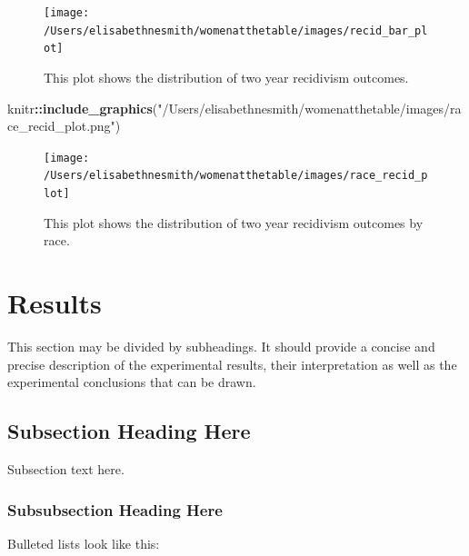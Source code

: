 \documentclass[water,article,submit,moreauthors,pdftex]{mdpi}
\newenvironment{Shaded}{\begin{snugshade}}{\end{snugshade}}
\newcommand{\KeywordTok}[1]{\textcolor[rgb]{0.13,0.29,0.53}{\textbf{#1}}}
\newcommand{\NormalTok}[1]{#1}
\newcommand{\OperatorTok}[1]{\textcolor[rgb]{0.81,0.36,0.00}{\textbf{#1}}}
\newcommand{\StringTok}[1]{\textcolor[rgb]{0.31,0.60,0.02}{#1}}
\begin{document}
\begin{figure}

{\centering \texttt{[image: /Users/elisabethnesmith/womenatthetable/images/recid\_bar\_plot]} 

}

\caption{This plot shows the distribution of two year recidivism outcomes.}\label{fig:recid plot}
\end{figure}

\begin{Shaded}
\begin{Highlighting}[]
\NormalTok{knitr}\OperatorTok{::}\KeywordTok{include_graphics}\NormalTok{(}\StringTok{"/Users/elisabethnesmith/womenatthetable/images/race_recid_plot.png"}\NormalTok{)}
\end{Highlighting}
\end{Shaded}

\begin{figure}

{\centering \texttt{[image: /Users/elisabethnesmith/womenatthetable/images/race\_recid\_plot]} 

}

\caption{This plot shows the distribution of two year recidivism outcomes by race.}\label{fig:recid race plot}
\end{figure}

\hypertarget{results}{%
\section{Results}\label{results}}

This section may be divided by subheadings. It should provide a concise
and precise description of the experimental results, their
interpretation as well as the experimental conclusions that can be
drawn.

\hypertarget{subsection-heading-here}{%
\subsection{Subsection Heading Here}\label{subsection-heading-here}}

Subsection text here.

\hypertarget{subsubsection-heading-here}{%
\subsubsection{Subsubsection Heading
Here}\label{subsubsection-heading-here}}

Bulleted lists look like this:
\end{document}
